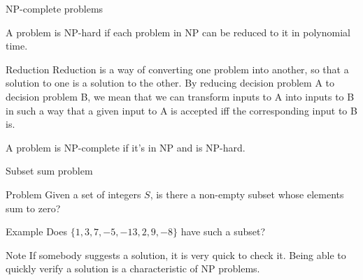 \begin{frame}{NP-complete problems}
  \begin{definition}
    A problem is NP-hard if each problem in NP can be reduced to it in polynomial time.
  \end{definition}

  \begin{alertblock}{Reduction}
    Reduction is a way of converting one problem into another, so that a solution to one is a solution to the other.
    By reducing decision problem A to decision problem B, we mean that we can transform inputs to A into inputs to B in such a way that a given input to A is accepted iff the corresponding input to B is.
  \end{alertblock}

  \begin{definition}
    A problem is NP-complete if it's in NP and is NP-hard.
  \end{definition}
\end{frame}


\begin{frame}{Subset sum problem}
  
  \begin{alertblock}{Problem}
    Given a set of integers $S$, is there a non-empty subset whose elements sum to zero?
  \end{alertblock}

  \vspace{4mm}
  
  \begin{exampleblock}{Example}
    Does $\{ 1, 3, 7, -5, -13, 2, 9, -8 \}$ have such a subset?
  \end{exampleblock}
  
  \vspace{4mm}

  \begin{alertblock}{Note}
     If somebody suggests a solution, it is very quick to check it.
    Being able to quickly verify a solution is a characteristic of NP problems.
  \end{alertblock}
\end{frame}


